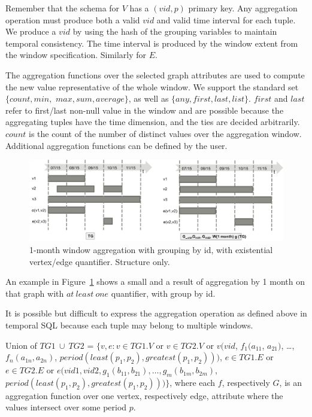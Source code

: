 Remember that the schema for $V$ has a $(vid, p)$ primary key.  Any
aggregation operation must produce both a valid $vid$ and valid time
interval for each tuple.  We produce a $vid$ by using the hash of the
grouping variables to maintain temporal consistency.  The time
interval is produced by the window extent from the window
specification. Similarly for $E$.

The aggregation functions over the selected graph attributes are used
to compute the new value representative of the whole window.  We
support the standard set $\{count, min,$ $max, sum, average\}$, as
well as $\{any, first, last, list\}$.  $first$ and $last$ refer to
first/last non-null value in the window and are possible because the
aggregating tuples have the time dimension, and the ties are decided
arbitrarily.  $count$ is the count of the number of distinct values
over the aggregation window.  Additional aggregation functions can be
defined by the user.

\begin{figure}
\includegraphics[width=6.5in]{figs/agg1.pdf}
\caption{1-month window aggregation with grouping by id, with
  existential vertex/edge quantifier.  Structure only.}
\label{fig:agg1}
\end{figure}

An example in Figure~\ref{fig:agg1} shows a small \tg and a result of
aggregation by 1 month on that graph with $at\ least\ one$ quantifier,
with group by id.

It is possible but difficult to express the aggregation operation as
defined above in temporal SQL because each tuple may belong to
multiple windows.

\begin{definition}[Union]
Union of $TG1\ \cup\ TG2$ = $\{v, e: v \in TG1.V$ or $v \in TG2.V$ or
$v(vid$, $f_1(a_{11}$, $a_{21})$, \ldots, $f_n(a_{1n}, a_{2n})$,
$period(least(p_1, p_2), greatest(p_1, p_2)))$, $e \in TG1.E$ or $e
\in TG2.E$ or $e(vid1, vid2, g_1(b_{11}, b_{21}), \ldots, g_m(b_{1m},
b_{2m})$, $period(least(p_1, p_2), greatest(p_1, p_2))) \}$, where
each $f$, respectively $G$, is an aggregation function over one
vertex, respectively edge, attribute where the values intersect over
some period $p$.
\label{def:union}
\end{definition}

